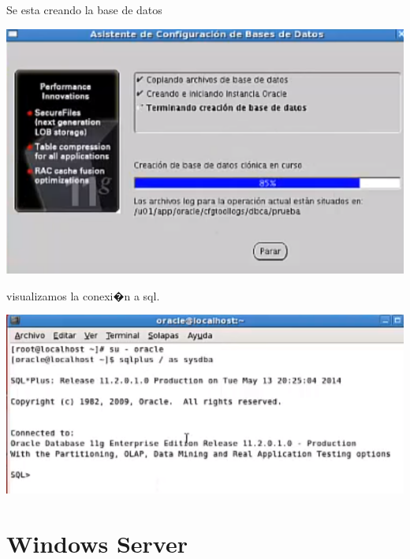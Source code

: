 \documentclass[12pt,letterpaper]{article}
\begin{document}
\newpage
Se esta creando la base de datos \\
\begin{center}
	\includegraphics[width=15cm]{oraclelinux/44.png}
\end{center}
visualizamos la conexi�n a sql.
\begin{center}
	\includegraphics[width=15cm]{oraclelinux/46.png}
\end{center}

\newpage

\section{Windows Server}
\end{document}

